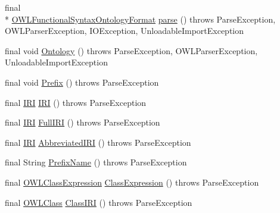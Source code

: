 \begin{DoxyCompactItemize}
\item 
final \\*
\hyperlink{classorg_1_1semanticweb_1_1owlapi_1_1io_1_1_o_w_l_functional_syntax_ontology_format}{O\-W\-L\-Functional\-Syntax\-Ontology\-Format} \hyperlink{classorg_1_1coode_1_1owlapi_1_1functionalparser_1_1_o_w_l_functional_syntax_parser_a72622ba6d54acb3d27156d80aee987c0}{parse} ()  throws Parse\-Exception,             O\-W\-L\-Parser\-Exception, I\-O\-Exception, Unloadable\-Import\-Exception 
\item 
final void \hyperlink{classorg_1_1coode_1_1owlapi_1_1functionalparser_1_1_o_w_l_functional_syntax_parser_a1102f38f59156c50ac68a85b7ed11661}{Ontology} ()  throws Parse\-Exception, O\-W\-L\-Parser\-Exception,             Unloadable\-Import\-Exception 
\item 
final void \hyperlink{classorg_1_1coode_1_1owlapi_1_1functionalparser_1_1_o_w_l_functional_syntax_parser_aee0f87971fec93aa73cbf84c35d80f5f}{Prefix} ()  throws Parse\-Exception 
\item 
final \hyperlink{classorg_1_1semanticweb_1_1owlapi_1_1model_1_1_i_r_i}{I\-R\-I} \hyperlink{classorg_1_1coode_1_1owlapi_1_1functionalparser_1_1_o_w_l_functional_syntax_parser_ac8dc1b376513bb68a81d3eb8ccbd4e0d}{I\-R\-I} ()  throws Parse\-Exception 
\item 
final \hyperlink{classorg_1_1semanticweb_1_1owlapi_1_1model_1_1_i_r_i}{I\-R\-I} \hyperlink{classorg_1_1coode_1_1owlapi_1_1functionalparser_1_1_o_w_l_functional_syntax_parser_ad575c29fe8974a19f2e657b38c93a252}{Full\-I\-R\-I} ()  throws Parse\-Exception 
\item 
final \hyperlink{classorg_1_1semanticweb_1_1owlapi_1_1model_1_1_i_r_i}{I\-R\-I} \hyperlink{classorg_1_1coode_1_1owlapi_1_1functionalparser_1_1_o_w_l_functional_syntax_parser_ad4391b7bd57c06d5662d17793003dd9d}{Abbreviated\-I\-R\-I} ()  throws Parse\-Exception 
\item 
final String \hyperlink{classorg_1_1coode_1_1owlapi_1_1functionalparser_1_1_o_w_l_functional_syntax_parser_aa1d15caa61b7abe8d1aa52ec3393f1de}{Prefix\-Name} ()  throws Parse\-Exception 
\item 
final \hyperlink{interfaceorg_1_1semanticweb_1_1owlapi_1_1model_1_1_o_w_l_class_expression}{O\-W\-L\-Class\-Expression} \hyperlink{classorg_1_1coode_1_1owlapi_1_1functionalparser_1_1_o_w_l_functional_syntax_parser_ab525694d0f509530292481d1beab4e9c}{Class\-Expression} ()  throws Parse\-Exception 
\item 
final \hyperlink{interfaceorg_1_1semanticweb_1_1owlapi_1_1model_1_1_o_w_l_class}{O\-W\-L\-Class} \hyperlink{classorg_1_1coode_1_1owlapi_1_1functionalparser_1_1_o_w_l_functional_syntax_parser_ad323eb2a46668aa2f020b2735b5182c3}{Class\-I\-R\-I} ()  throws Parse\-Exception 

\end{DoxyCompactItemize}
